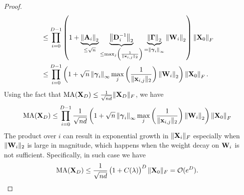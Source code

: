 \documentclass[journal]{IEEEtran}
\newcommand{\bfA}{{\bf A}}
\newcommand{\bfD}{{\bf D}}
\newcommand{\bfW}{{\bf W}}
\newcommand{\bfX}{{\bf X}}
\newcommand{\bfx}{{\bf x}}
\newcommand{\bfgamma}{{\boldsymbol \gamma}}
\newcommand{\bfGamma}{{\boldsymbol \Gamma}}
\theoremstyle{plain}
\theoremstyle{definition}
\theoremstyle{remark}
\begin{document}
\begin{proof}
\begin{align}
        & \leq \prod_{i=0}^{D-1}\left( 1 +  \underbrace{\left\| \bfA_i\right\|_2}_{\leq \sqrt{n}} \underbrace{\left\| \bfD_i^{-1} \right\|_2}_{\leq \max_j \left(\frac{1}{\| \bfx_{i,j} \|_2} \right)} \underbrace{\left\| \bfGamma \right\|_2}_{= \left\| \bfgamma_i \right\|_\infty} \left\| \bfW_i \right\|_2 \right)   \left\|\bfX_0\right\|_F \\
        &\leq  \prod_{i=0}^{D-1} \left( 1 +  { \sqrt{n}} \left\| \bfgamma_i \right\|_\infty { \max_j \left(\frac{1}{\| \bfx_{i,j} \|_2} \right)}  \left\| \bfW_i \right\|_2 \right)   \left\|\bfX_0\right\|_F.
    \end{align}
    Using the fact that ${\rm MA}(\bfX_D) \leq \frac{1}{\sqrt{nd}} \| \bfX_D\|_F$, we have
    \begin{equation}
        {\rm MA}(\bfX_D) \leq \prod_{i=0}^{D-1} \frac{1}{\sqrt{nd}}\left( 1 +  { \sqrt{n}} \left\| \bfgamma_i \right\|_\infty { \max_j \left(\frac{1}{\| \bfx_{i,j} \|_2} \right)}  \left\| \bfW_i \right\|_2 \right)   \left\|\bfX_0\right\|_F
    \end{equation}
    The product over $i$ can result in exponential growth in $\| \bfX_i \|_F$ especially when $\| \bfW_i \|_2$ is large in magnitude, which happens when the weight decay on $\bfW_i$ is not sufficient. Specifically, in such case we have
    \begin{equation}
        {\rm MA}(\bfX_D) \leq \frac{1}{\sqrt{nd}} \, \bigl(1 + C(\lambda)\bigr)^D \, \|\bfX_0\|_F = \mathcal{O}(e^D).
    \end{equation}
    
\end{proof}
\end{document}
